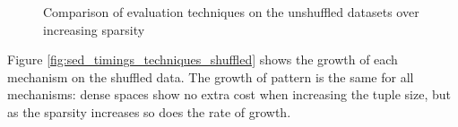 \begin{figure}
        \caption[Comparison of evaluation techniques on the unshuffled dataset over increasing sparsity]{Comparison of evaluation techniques on the unshuffled datasets over increasing sparsity}\label{fig:sed_timings_unshuffled}
\end{figure}

Figure \ref{fig:sed_timings_techniques_shuffled} shows the growth of each mechanism on the shuffled data.  The growth of pattern is the same for all mechanisms: dense spaces show no extra cost when increasing the tuple size, but as the sparsity increases so does the rate of growth.
\begin{figure}
        \centering
        ~ 
        
         
        ~ 
        

\end{figure}
